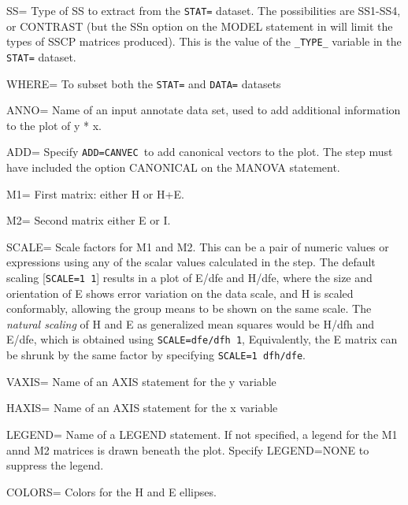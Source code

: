 \begin{proglist}
\item[SS=] Type of SS to extract from the \texttt{STAT=} dataset. The possibilities
are SS1-SS4, or CONTRAST (but the SSn option on the MODEL statement in
 will limit the types of SSCP matrices produced).
This is the value of the \verb|_TYPE_| variable in the \texttt{STAT=} dataset.

\item[WHERE=] To subset both the \texttt{STAT=} and \texttt{DATA=} datasets

\item[ANNO=] Name of an input annotate data set, used to add additional
information to the plot of y * x.

\item[ADD=] Specify \texttt{ADD=CANVEC }to add canonical vectors to the plot. The
 step must have included the option CANONICAL on the
MANOVA statement.

\item[M1=] First matrix: either H or H+E. 

\item[M2=] Second matrix either E or I. 

\item[SCALE=] Scale factors for M1 and M2.  This can be a pair of numeric
values or expressions using any of the scalar values calculated
in the  step.  The default scaling [\texttt{SCALE=1 1}]
results in a plot of E/dfe and H/dfe, where the size 
and orientation of E shows error variation on the data scale,
and H is scaled conformably, allowing the group means to be
shown on the same scale. The \emph{natural scaling} of H and E
as generalized mean squares would be H/dfh and E/dfe, which is
obtained using \texttt{SCALE=dfe/dfh 1}, Equivalently, the E matrix can
be shrunk by the same factor by specifying \texttt{SCALE=1 dfh/dfe}.

\item[VAXIS=] Name of an AXIS statement for the y variable

\item[HAXIS=] Name of an AXIS statement for the x variable

\item[LEGEND=] Name of a LEGEND statement.  If not specified, a legend for
the M1 annd M2 matrices is drawn beneath the plot. Specify LEGEND=NONE
to suppress the legend.

\item[COLORS=] Colors for the H and E ellipses. 


\end{proglist}
